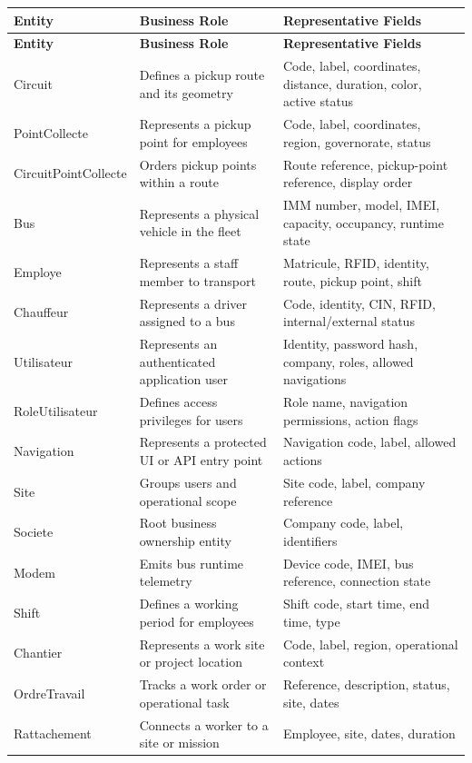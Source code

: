 \small
\begin{longtable}{p{3.5cm}p{4.6cm}p{5.4cm}}
\toprule
\textbf{Entity} & \textbf{Business Role} & \textbf{Representative Fields} \\
\midrule
\endfirsthead
\toprule
\textbf{Entity} & \textbf{Business Role} & \textbf{Representative Fields} \\
\midrule
\endhead
\bottomrule
\endlastfoot
Circuit & Defines a pickup route and its geometry & Code, label, coordinates, distance, duration, color, active status \\
PointCollecte & Represents a pickup point for employees & Code, label, coordinates, region, governorate, status \\
CircuitPointCollecte & Orders pickup points within a route & Route reference, pickup-point reference, display order \\
Bus & Represents a physical vehicle in the fleet & IMM number, model, IMEI, capacity, occupancy, runtime state \\
Employe & Represents a staff member to transport & Matricule, RFID, identity, route, pickup point, shift \\
Chauffeur & Represents a driver assigned to a bus & Code, identity, CIN, RFID, internal/external status \\
Utilisateur & Represents an authenticated application user & Identity, password hash, company, roles, allowed navigations \\
RoleUtilisateur & Defines access privileges for users & Role name, navigation permissions, action flags \\
Navigation & Represents a protected UI or API entry point & Navigation code, label, allowed actions \\
Site & Groups users and operational scope & Site code, label, company reference \\
Societe & Root business ownership entity & Company code, label, identifiers \\
Modem & Emits bus runtime telemetry & Device code, IMEI, bus reference, connection state \\
Shift & Defines a working period for employees & Shift code, start time, end time, type \\
Chantier & Represents a work site or project location & Code, label, region, operational context \\
OrdreTravail & Tracks a work order or operational task & Reference, description, status, site, dates \\
Rattachement & Connects a worker to a site or mission & Employee, site, dates, duration \\

\end{longtable}
